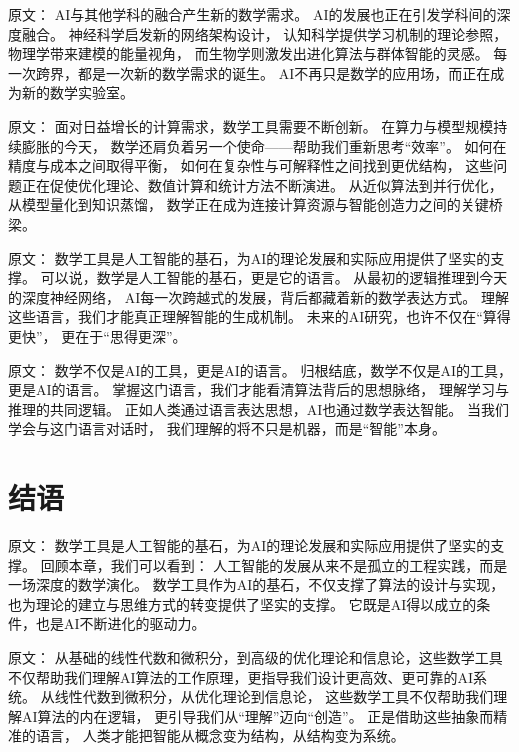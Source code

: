 原文：
AI与其他学科的融合产生新的数学需求。
AI的发展也正在引发学科间的深度融合。  
神经科学启发新的网络架构设计，  
认知科学提供学习机制的理论参照，  
物理学带来建模的能量视角，  
而生物学则激发出进化算法与群体智能的灵感。  
每一次跨界，都是一次新的数学需求的诞生。  
AI不再只是数学的应用场，而正在成为新的数学实验室。



原文：
面对日益增长的计算需求，数学工具需要不断创新。
在算力与模型规模持续膨胀的今天，  
数学还肩负着另一个使命——帮助我们重新思考“效率”。  
如何在精度与成本之间取得平衡，  
如何在复杂性与可解释性之间找到更优结构，  
这些问题正在促使优化理论、数值计算和统计方法不断演进。  
从近似算法到并行优化，从模型量化到知识蒸馏，  
数学正在成为连接计算资源与智能创造力之间的关键桥梁。



原文：
数学工具是人工智能的基石，为AI的理论发展和实际应用提供了坚实的支撑。
可以说，数学是人工智能的基石，更是它的语言。  
从最初的逻辑推理到今天的深度神经网络，  
AI每一次跨越式的发展，背后都藏着新的数学表达方式。  
理解这些语言，我们才能真正理解智能的生成机制。  
未来的AI研究，也许不仅在“算得更快”，  
更在于“思得更深”。



原文：
数学不仅是AI的工具，更是AI的语言。
归根结底，数学不仅是AI的工具，更是AI的语言。  
掌握这门语言，我们才能看清算法背后的思想脉络，  
理解学习与推理的共同逻辑。  
正如人类通过语言表达思想，AI也通过数学表达智能。  
当我们学会与这门语言对话时，  
我们理解的将不只是机器，而是“智能”本身。


\section{结语}

原文：
数学工具是人工智能的基石，为AI的理论发展和实际应用提供了坚实的支撑。
回顾本章，我们可以看到：  
人工智能的发展从来不是孤立的工程实践，而是一场深度的数学演化。  
数学工具作为AI的基石，不仅支撑了算法的设计与实现，  
也为理论的建立与思维方式的转变提供了坚实的支撑。  
它既是AI得以成立的条件，也是AI不断进化的驱动力。



原文：
从基础的线性代数和微积分，到高级的优化理论和信息论，这些数学工具不仅帮助我们理解AI算法的工作原理，更指导我们设计更高效、更可靠的AI系统。
从线性代数到微积分，从优化理论到信息论，  
这些数学工具不仅帮助我们理解AI算法的内在逻辑，  
更引导我们从“理解”迈向“创造”。  
正是借助这些抽象而精准的语言，  
人类才能把智能从概念变为结构，从结构变为系统。



